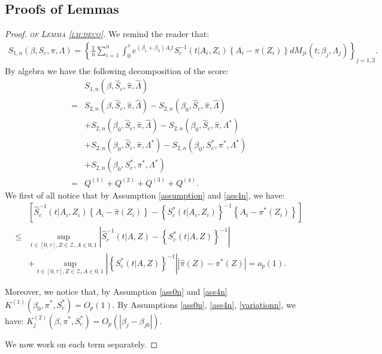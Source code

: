 \documentclass[11pt]{article}
\newcommand{\ee}{\end{eqnarray}}
\newcommand{\eqnn}{\begin{eqnarray*}}
\newcommand{\een}{\end{eqnarray*}}
\newcommand{\be}{\begin{eqnarray}}
\begin{document}

\newpage
\subsection{Proofs of Lemmas}\label{lemmas}

\newenvironment{newproof7}{\begin{proof}\textsc{\emph{of Lemma \ref{lm:deco}.}}}{\end{proof}}

\begin{newproof7}
We remind the reader that:
\eqnn
{S}_{1,n}(\beta, S_c,  \pi, \Lambda)=\left\{\frac{1}{n}\sum_{i=1}^n\int_0^\tau e^{ (\beta_1  + \beta_2) A_i t}S^{-1}_c(t | A_i,Z_i)\left\{A_i -\pi( Z_i)\right\}dM_{ji}(t ; \beta_j, \Lambda_{j})\right\}_{j=1,2}.
\een
By algebra we have the following decomposition of the score:
\eqnn
&&{S}_{1,n}(\beta, \hat S_c,  \hat \pi, \hat \Lambda)\\&=&  S_{2,n}({\beta}, \hat S_c,  \hat \pi,  \hat \Lambda)-S_{2,n}({\beta}_0, \hat S_c,  \hat \pi,  \hat \Lambda)\\
&&+S_{2,n}({\beta}_0, \hat S_c,  \hat \pi,  \hat \Lambda)-S_{2,n}({\beta}_0, \hat S_c,  \hat \pi,  \Lambda^{*})\\
&&+ S_{2,n}({\beta}_0, \hat S_c,  \hat \pi, \Lambda^{*})-S_{2,n}({\beta}_0, S^{*}_c,  \pi^{*}, \Lambda^{*})\\
&&+ S_{2,n}({\beta}_0, S^{*}_c,  \pi^{*}, \Lambda^{*})\\
&=&Q^{(1)}+Q^{(2)}+Q^{(3)}+Q^{(4)}.
\een
We first of all notice that by Assumption \ref{assumption} and \ref{ass4n}, we have:
\be\label{nuisnew}
&&\left[\hat S^{-1}_c(t | A_i,Z_i)\left\{A_i -\hat \pi( Z_i)\right\}- \left\{S^{*}_c(t | A_i,Z_i)\right\}^{-1}\left\{A_i - \pi^{*}( Z_i)\right\}\right]\\&\leq&\sup_{t \in [0,\tau],Z \in \mathcal{Z}, A \in {0,1}}\left|\hat S^{-1}_c(t | A,Z)- \left\{S^{*}_c(t | A,Z)\right\}^{-1}\right|\\&&+\sup_{t \in [0,\tau], Z \in \mathcal{Z}, A \in {0,1}}\left| \left\{S^{*}_c(t | A,Z)\right\}^{-1}\right|\left|\hat \pi( Z) - \pi^{*}( Z)\right|=o_p(1).
\ee

Moreover, we notice that, by Assumption \ref{ass0n} and \ref{ass4n}
$
K^{(1)}(\beta_0,\pi^{*},S^{*}_c)=O_p(1).
$
By Assumptions \ref{ass0n}, \ref{ass4n}, \ref{variationn}, we have:
$
K^{(2)}_j(\beta,\pi^{*},S^{*}_c)=O_p(|\beta_j-\beta_{j0}|).
$

We now work on each term separately. 


\end{newproof7}
\end{document}
